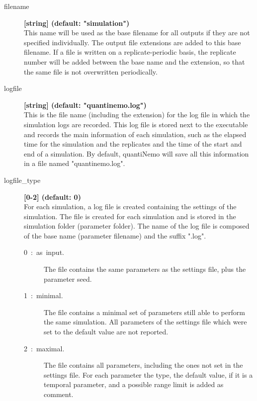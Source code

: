 \documentclass[letterpaper,12pt,oneside]{book}
\begin{document}
\begin{description}
\item[filename]\textbf{[string] (default: "simulation")}\\
This name will be used as the base filename for all outputs if they are not specified individually. The output file extensions are added to this base filename. If a file is written on a replicate-periodic basis, the replicate number will be added between the base name and the extension, so that the same file is not overwritten periodically.  


\item[logfile] \textbf{[string] (default: "quantinemo.log")}\\
This is the file name (including the extension) for the log file in which the simulation logs are recorded. This log file is stored next to the executable and records the main information of each simulation, such as the elapsed time for the simulation and the replicates and the time of the start and end of a simulation. By default, quantiNemo will save all this information in a file named "quantinemo.log".

\item[logfile\_type] \textbf{[0-2] (default: 0)}\\
For each simulation, a log file is created containing the settings of the simulation. The file is created for each simulation and is stored in the simulation folder (parameter \textsf{folder}). The name of the log file is composed of the base name (parameter \textsf{filename}) and the suffix ".log". 
\begin{description}
\item[0~:~as~input.] The file contains the same parameters as the settings file, plus the parameter \textsf{seed}.
\item[1~:~minimal.] The file contains a minimal set of parameters still able to perform the same simulation. All parameters of the settings file which were set to the default value are not reported. 
\item[2~:~maximal.] The file contains all parameters, including the ones not set in the settings file. For each parameter the type, the default value, if it is a temporal parameter, and a possible range limit is added as comment.
\end{description}


\end{description}
\end{document}

